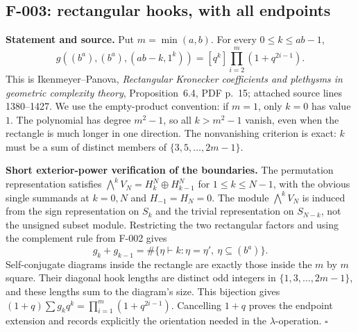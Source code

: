 \subsection{F-003: rectangular hooks, with all endpoints}
\textbf{Statement and source.}
Put $m=\min(a,b)$. For every $0\leq k\leq ab-1$,
\[
 g((b^a),(b^a),(ab-k,1^k))
 =[q^k]\prod_{i=2}^m(1+q^{2i-1}).                    \tag{F-003.1}
\]
This is Ikenmeyer--Panova, \emph{Rectangular Kronecker coefficients and
plethysms in geometric complexity theory}, Proposition~6.4, PDF p.~15;
attached source lines 1380--1427. We use the empty-product convention:
if $m=1$, only $k=0$ has value $1$. The polynomial has degree $m^2-1$, so
all $k>m^2-1$ vanish, even when the rectangle is much longer in one direction.
The nonvanishing criterion is exact: $k$ must be a sum of distinct members
of $\{3,5,\ldots,2m-1\}$.

\textbf{Short exterior-power verification of the boundaries.}
The permutation representation satisfies
$\bigwedge^kV_N=H_k^N\oplus H_{k-1}^N$ for $1\leq k\leq N-1$,
with the obvious single summands at $k=0,N$ and $H_{-1}=H_N=0$.
The module $\bigwedge^kV_N$ is induced from the sign representation on
$S_k$ and the trivial representation on $S_{N-k}$, not the unsigned subset
module. Restricting the two rectangular factors and using the complement
rule from F-002 gives
\[
 g_k+g_{k-1}=\#\{\eta\vdash k:\eta=\eta',\ \eta\subseteq(b^a)\}.
\]
Self-conjugate diagrams inside the rectangle are exactly those inside the
$m$ by $m$ square. Their diagonal hook lengths are distinct odd integers in
$\{1,3,\ldots,2m-1\}$, and these lengths sum to the diagram's size.
This bijection gives $(1+q)\sum g_kq^k=\prod_{i=1}^m(1+q^{2i-1})$.
Cancelling $1+q$ proves the endpoint extension and records explicitly the
orientation needed in the $\lambda$-operation. \hfill$\square$


